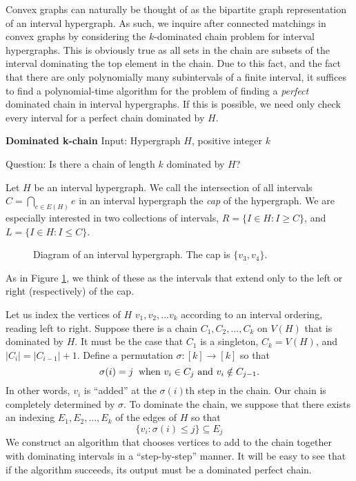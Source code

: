Convex graphs can naturally be thought of as the bipartite graph representation of an interval hypergraph.   
%
As such, we inquire after connected matchings in convex graphs by considering the $k$-dominated chain problem for interval hypergraphs.
%
This is obviously true as all sets in the chain are subsets of the interval dominating the top element in the chain.  Due to this fact, and the fact that there are only polynomially many subintervals of a finite interval, it  suffices to find a polynomial-time algorithm for the problem of finding a {\it perfect} dominated chain in interval hypergraphs.  If this is possible, we need only check every interval for a perfect chain dominated by $H$.
\begin{framed}\noindent\textbf{Dominated k-chain}
	\vskip 0.5cm
	\noindent Input: Hypergraph $H$, positive integer $k$
	
	\noindent Question: Is there a chain of length $k$ dominated by $H$?
\end{framed}

Let $H$ be an interval hypergraph.  We call the intersection of all intervals $C = \bigcap_{e \in E(H)} e$ in an interval hypergraph the {\it cap} of the hypergraph.  
%
We are especially interested in two collections of intervals, $R = \{I \in H : I \geq C\}$, and $L = \{I \in H : I \leq C\}$.
%
\begin{figure}
	\begin{center}
	
	\end{center}
	\caption{Diagram of an interval hypergraph.  The cap is $\{v_3,v_4\}$.}
	\label{interval_diag}
\end{figure}
 As in Figure \ref{interval_diag}, we think of these as the intervals that extend only to the left or right (respectively) of the cap.

Let us index the vertices of $H$ $v_1, v_2,...v_k$ according to an interval ordering, reading left to right.
%
Suppose there is a chain $C_1, C_2, \ldots, C_k$ on $V(H)$ that is dominated by $H$.  
%
It must be the case that $C_1$ is a singleton, $C_k = V(H)$, and $|C_i| = |C_{i-1}| + 1$.  
%
Define a permutation $\sigma : [k] \rightarrow [k]$ so that 
\[\sigma(i) = j \:\makebox{ when $v_i \in C_j$ and $v_i \notin C_{j-1}$}.\]
%
In other words, $v_i$ is ``added'' at the $\sigma(i)$th step in the chain.
%
Our chain is completely determined by $\sigma$.
%
To dominate the chain, we suppose that there exists an indexing $E_1, E_2, \ldots, E_k$ of the edges of $H$ so that 
\[\{v_i : \sigma(i) \leq j\} \subseteq E_j\]
%
 We construct an algorithm that chooses vertices to add to the chain together with dominating intervals in a ``step-by-step'' manner.
%
It will be easy to see that if the algorithm succeeds, its output must be a dominated perfect chain.
%

